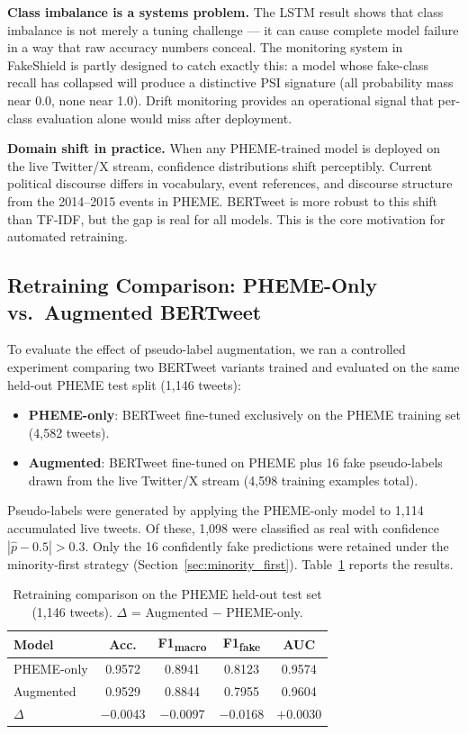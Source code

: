 \documentclass[sigconf]{acmart}
\begin{document}
\textbf{Class imbalance is a systems problem.} The LSTM result shows that class imbalance
is not merely a tuning challenge — it can cause complete model failure in a way that raw
accuracy numbers conceal. The monitoring system in FakeShield is partly designed to catch
exactly this: a model whose fake-class recall has collapsed will produce a distinctive PSI
signature (all probability mass near 0.0, none near 1.0). Drift monitoring provides an
operational signal that per-class evaluation alone would miss after deployment.

\textbf{Domain shift in practice.} When any PHEME-trained model is deployed on the live
Twitter/X stream, confidence distributions shift perceptibly. Current political discourse
differs in vocabulary, event references, and discourse structure from the 2014--2015 events
in PHEME. BERTweet is more robust to this shift than TF-IDF, but the gap is real for all
models. This is the core motivation for automated retraining.


\subsection{Retraining Comparison: PHEME-Only vs.\ Augmented BERTweet}
\label{sec:retraining}

To evaluate the effect of pseudo-label augmentation, we ran a controlled experiment comparing
two BERTweet variants trained and evaluated on the same held-out PHEME test split (1,146 tweets):

\begin{itemize}
  \item \textbf{PHEME-only}: BERTweet fine-tuned exclusively on the PHEME training set (4,582 tweets).
  \item \textbf{Augmented}: BERTweet fine-tuned on PHEME plus 16 fake pseudo-labels
        drawn from the live Twitter/X stream (4,598 training examples total).
\end{itemize}

Pseudo-labels were generated by applying the PHEME-only model to 1,114 accumulated live
tweets. Of these, 1,098 were classified as real with confidence $|\hat{p} - 0.5| > 0.3$.
Only the 16 confidently fake predictions were retained under the minority-first strategy
(Section~\ref{sec:minority_first}). Table~\ref{tab:retraining} reports the results.

\begin{table}[h]
\centering
\caption{Retraining comparison on the PHEME held-out test set (1,146 tweets).
         $\Delta$ = Augmented $-$ PHEME-only.}
\label{tab:retraining}
\begin{tabular}{lcccc}
\toprule
\textbf{Model} & \textbf{Acc.} & \textbf{F1\textsubscript{macro}} & \textbf{F1\textsubscript{fake}} & \textbf{AUC} \\
\midrule
PHEME-only   & 0.9572 & 0.8941 & 0.8123 & 0.9574 \\
Augmented    & 0.9529 & 0.8844 & 0.7955 & 0.9604 \\
\midrule
$\Delta$     & $-$0.0043 & $-$0.0097 & $-$0.0168 & $+$0.0030 \\
\bottomrule
\end{tabular}
\end{table}
\end{document}
